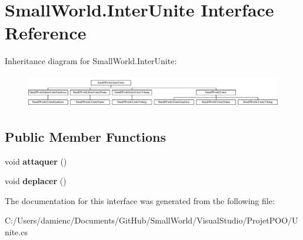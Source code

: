 \hypertarget{interface_small_world_1_1_inter_unite}{\section{Small\-World.\-Inter\-Unite Interface Reference}
\label{interface_small_world_1_1_inter_unite}
}
Inheritance diagram for Small\-World.\-Inter\-Unite\-:\begin{figure}[H]
\begin{center}
\leavevmode
\includegraphics[height=1.481482cm]{interface_small_world_1_1_inter_unite}
\end{center}
\end{figure}
\subsection*{Public Member Functions}
\begin{DoxyCompactItemize}
\item 
\hypertarget{interface_small_world_1_1_inter_unite_a1a5d372f4b0e3df0729649ea0ffef763}{void {\bfseries attaquer} ()}\label{interface_small_world_1_1_inter_unite_a1a5d372f4b0e3df0729649ea0ffef763}

\item 
\hypertarget{interface_small_world_1_1_inter_unite_a56e9c8df0434d82d009cba43ebfebed5}{void {\bfseries deplacer} ()}\label{interface_small_world_1_1_inter_unite_a56e9c8df0434d82d009cba43ebfebed5}

\end{DoxyCompactItemize}


The documentation for this interface was generated from the following file\-:\begin{DoxyCompactItemize}
\item 
C\-:/\-Users/damienc/\-Documents/\-Git\-Hub/\-Small\-World/\-Visual\-Studio/\-Projet\-P\-O\-O/Unite.\-cs\end{DoxyCompactItemize}
